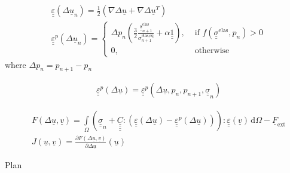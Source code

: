 \documentclass[12pt]{article}
\newcommand\ul[1]{\underline{#1}}
\newcommand\uusigma{\ul{\ul{\sigma}}}
\newcommand\uv{\ul{v}}
\newcommand\uF{\ul{F}}
\newcommand\uu{\ul{u}}
\newcommand\uus{\ul{\ul{s}}}
\newcommand\uuUnit{\ul{\ul{1}}}
\newcommand\uueps{\ul{\ul{\varepsilon}}}
\newcommand{\uuuuC}{\ul{\ul{\ul{\ul{C}}}}}
\newcommand\sigmaeqnelas{\sigma_{n+1}^\text{elas,eq}}
\newcommand\uusnelas{\uus_{n+1}^\text{elas}}
\newcommand\md{\mathrm{d}}
\begin{document}
\begin{align}
    & \uueps(\Delta\uu_n) = \frac{1}{2} \left( \nabla\Delta\uu + \nabla\Delta\uu^T \right) \\
    & \uueps^p(\Delta\uu_n) = 
        \begin{cases}
            \Delta p_n \left( \frac{3}{2}\frac{\uusnelas}{\sigmaeqnelas} + \alpha \uuUnit \right), & \text{ if } f(\uusigma^\text{elas}, p_n) > 0  \\
            0, & \text{ otherwise}
        \end{cases}
\end{align}
where $\Delta p_n = p_{n+1} - p_n$ 

\begin{align}
    & \uueps^p(\Delta\uu) = \uueps^p(\Delta\uu, p_n, p_{n+1}, \uusigma_n)
\end{align}

\begin{align}
    & F(\Delta\uu, \uv) = \int\limits_\Omega \left( \uusigma_n + \uuuuC : (\uueps(\Delta\uu) - \uueps^p(\Delta\uu)) \right) : \uueps(\uv) \, \md\Omega - \uF_\text{ext} \\
    & J(\uu, \uv) = \frac{\partial F(\Delta\uu, \uv)}{\partial\Delta\uu}(\uu)
\end{align}

Plan
\end{document}
